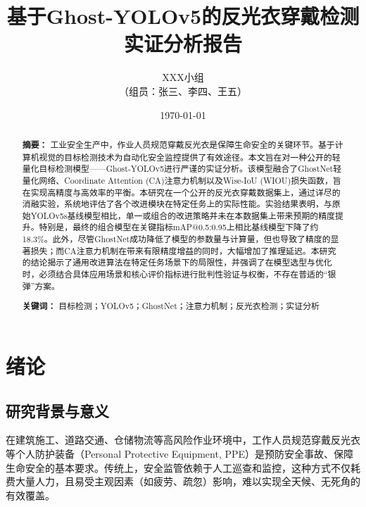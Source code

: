 \documentclass[a4paper]{ctexart}
\begin{document}
\title{\heiti \Huge 基于Ghost-YOLOv5的反光衣穿戴检测实证分析报告}
\author{XXX小组 \\ （组员：张三、李四、王五）}
\date{\today}
\maketitle
\thispagestyle{empty} %
\newpage

\begin{abstract}
    \noindent \textbf{摘要：} 工业安全生产中，作业人员规范穿戴反光衣是保障生命安全的关键环节。基于计算机视觉的目标检测技术为自动化安全监控提供了有效途径。本文旨在对一种公开的轻量化目标检测模型——Ghost-YOLOv5进行严谨的实证分析。该模型融合了GhostNet轻量化网络、Coordinate Attention (CA)注意力机制以及Wise-IoU (WIOU)损失函数，旨在实现高精度与高效率的平衡。本研究在一个公开的反光衣穿戴数据集上，通过详尽的消融实验，系统地评估了各个改进模块在特定任务上的实际性能。实验结果表明，与原始YOLOv5s基线模型相比，单一或组合的改进策略并未在本数据集上带来预期的精度提升。特别是，最终的组合模型在关键指标mAP@0.5:0.95上相比基线模型下降了约18.3\%。此外，尽管GhostNet成功降低了模型的参数量与计算量，但也导致了精度的显著损失；而CA注意力机制在带来有限精度增益的同时，大幅增加了推理延迟。本研究的结论揭示了通用改进算法在特定任务场景下的局限性，并强调了在模型选型与优化时，必须结合具体应用场景和核心评价指标进行批判性验证与权衡，不存在普适的“银弹”方案。
    \vspace{1cm}

    \noindent \textbf{关键词：} 目标检测；YOLOv5；GhostNet；注意力机制；反光衣检测；实证分析
\end{abstract}
\newpage

\tableofcontents
\newpage

\section{绪论}

\subsection{研究背景与意义}
在建筑施工、道路交通、仓储物流等高风险作业环境中，工作人员规范穿戴反光衣等个人防护装备（Personal Protective Equipment, PPE）是预防安全事故、保障生命安全的基本要求。传统上，安全监管依赖于人工巡查和监控，这种方式不仅耗费大量人力，且易受主观因素（如疲劳、疏忽）影响，难以实现全天候、无死角的有效覆盖。
\end{document}
